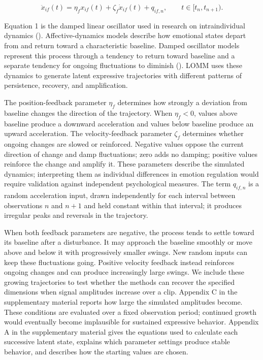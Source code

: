 \documentclass[
]{article}
\begin{document}
\begin{equation}
\ddot{x}_{if}(t)
=
\eta_f x_{if}(t)
+
\zeta_f\dot{x}_{if}(t)
+
q_{if,n},
\qquad t\in[t_n,t_{n+1}).
\label{eq:lomm-latent}
\end{equation}

Equation 1 is the damped linear oscillator used in research on
intraindividual dynamics (). Affective-dynamics models describe how emotional
states depart from and return toward a characteristic baseline. Damped
oscillator models represent this process through a tendency to return
toward baseline and a separate tendency for ongoing fluctuations to
diminish (). LOMM
uses these dynamics to generate latent expressive trajectories with
different patterns of persistence, recovery, and amplification.

The position-feedback parameter \(\eta_f\) determines how strongly a
deviation from baseline changes the direction of the trajectory. When
\(\eta_f<0\), values above baseline produce a downward acceleration and
values below baseline produce an upward acceleration. The
velocity-feedback parameter \(\zeta_f\) determines whether ongoing
changes are slowed or reinforced. Negative values oppose the current
direction of change and damp fluctuations; zero adds no damping;
positive values reinforce the change and amplify it. These parameters
describe the simulated dynamics; interpreting them as individual
differences in emotion regulation would require validation against
independent psychological measures. The term \(q_{if,n}\) is a random
acceleration input, drawn independently for each interval between
observations \(n\) and \(n+1\) and held constant within that interval;
it produces irregular peaks and reversals in the trajectory.

When both feedback parameters are negative, the process tends to settle
toward its baseline after a disturbance. It may approach the baseline
smoothly or move above and below it with progressively smaller swings.
New random inputs can keep these fluctuations going. Positive velocity
feedback instead reinforces ongoing changes and can produce increasingly
large swings. We include these growing trajectories to test whether the
methods can recover the specified dimensions when signal amplitudes
increase over a clip. Appendix C in the supplementary material reports
how large the simulated amplitudes become. These conditions are
evaluated over a fixed observation period; continued growth would
eventually become implausible for sustained expressive behavior.
Appendix A in the supplementary material gives the equations used to
calculate each successive latent state, explains which parameter
settings produce stable behavior, and describes how the starting values
are chosen.
\end{document}
